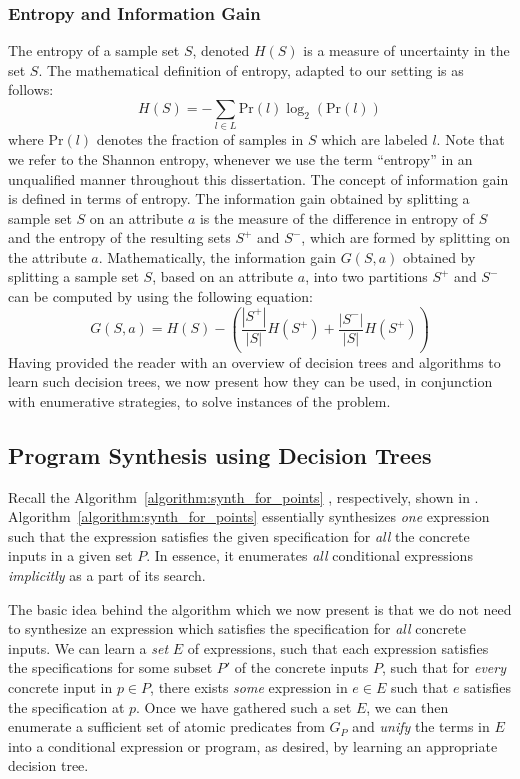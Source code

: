 \subsubsection{Entropy and Information Gain}
The entropy of a sample set $S$, denoted $H(S)$ is a measure of
uncertainty in the set $S$. The mathematical definition of entropy,
adapted to our setting is as follows:
\begin{equation}
H(S) = - \sum_{l \in L}\mathrm{Pr}(l)\log_2(\mathrm{Pr}(l))
\label{eqn:entropy}
\end{equation}
where $\mathrm{Pr}(l)$ denotes the fraction of samples in $S$ which
are labeled $l$. Note that we refer to the Shannon entropy, whenever
we use the term ``entropy'' in an unqualified manner throughout this
dissertation. The concept of information gain is defined in terms of
entropy. The information gain obtained by splitting a sample set $S$
on an attribute $a$ is the measure of the difference in entropy of $S$
and the entropy of the resulting sets $S^+$ and $S^-$, which are
formed by splitting on the attribute $a$. Mathematically, the
information gain $G(S, a)$ obtained by splitting a sample set $S$,
based on an attribute $a$, into two partitions $S^+$ and $S^-$ can be
computed by using the following equation:
\begin{equation}
G(S, a) = H(S) - \left(\frac{|S^+|}{|S|} H\left(S^+\right) +
  \frac{|S^-|}{|S|} H\left(S^+\right)\right)
\label{eqn:info_gain}
\end{equation}
Having provided the reader with an overview of decision trees and
algorithms to learn such decision trees, we now present how they can
be used, in conjunction with enumerative strategies, to solve
instances of the \sygusbody problem.

\subsection{Program Synthesis using Decision Trees}
\label{subsection:synthesis_using_decision_trees}
Recall the Algorithm~\ref{algorithm:synth_for_points}
\synthforpoints, respectively, shown in
. Algorithm~\ref{algorithm:synth_for_points}
essentially synthesizes \emph{one} expression such that the expression
satisfies the given specification for \emph{all} the concrete inputs
in a given set $P$. In essence, it enumerates \emph{all} conditional
expressions \emph{implicitly} as a part of its search.

The basic idea behind the algorithm which we now present is that we do
not need to synthesize an expression which satisfies the specification
for \emph{all} concrete inputs. We can learn a \emph{set} $E$ of
expressions, such that each expression satisfies the specifications
for some subset $P'$ of the concrete inputs $P$, such that for \emph{every}
concrete input in $p \in P$, there exists \emph{some} expression in $e
\in E$ such that $e$ satisfies the specification at $p$. Once we have
gathered such a set $E$, we can then enumerate a sufficient set of
atomic predicates from $G_P$ and \emph{unify} the terms in $E$ into a
conditional expression or program, as desired, by learning an
appropriate decision tree.

